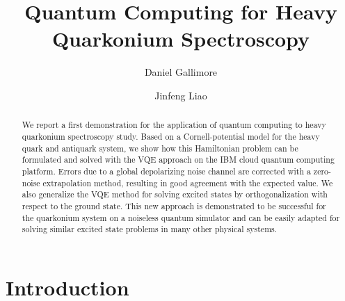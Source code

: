 \documentclass[aps,10pt,superscriptaddress,floatfix,nofootinbib,notitlepage]{revtex4-1}
\begin{document}
\title{Quantum Computing for Heavy Quarkonium Spectroscopy}



 \author{Daniel Gallimore}

 \author{Jinfeng Liao}

 


 

\begin{abstract} 

    We report a first demonstration for the application of quantum computing to heavy quarkonium spectroscopy study. Based on a Cornell-potential model for the heavy quark and antiquark system, we show how this Hamiltonian problem can be formulated and solved with the VQE approach on the IBM cloud quantum computing platform. 
     Errors due to a global depolarizing noise channel are corrected with a zero-noise extrapolation method, resulting in good agreement with the expected value. We also generalize the VQE method for solving excited states by orthogonalization  with respect to the ground state. This new approach is demonstrated to be successful for the quarkonium system  on a noiseless quantum simulator and can be easily adapted for solving similar excited state problems in many other physical systems.
\end{abstract}


\maketitle
 


\section{Introduction}
\end{document}
